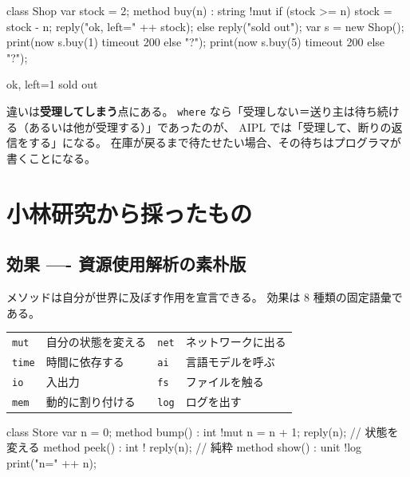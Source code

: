 \documentclass[11pt,a4paper]{ltjsarticle}
\theoremstyle{definition}
\theoremstyle{remark}
\begin{document}
\begin{aipl}
class Shop {
  var stock = 2;
  method buy(n) : string !{mut} {
    if (stock >= n) { stock = stock - n; reply("ok, left=" ++ stock); }
    else { reply("sold out"); }
  }
}
var s = new Shop();
print(now s.buy(1) timeout 200 else "?");
print(now s.buy(5) timeout 200 else "?");
\end{aipl}
\begin{term}
ok, left=1
sold out
\end{term}

違いは\textbf{受理してしまう}点にある。
\texttt{where} なら「受理しない＝送り主は待ち続ける（あるいは他が受理する）」であったのが、
AIPL では「受理して、断りの返信をする」になる。
在庫が戻るまで待たせたい場合、その待ちはプログラマが書くことになる。

\section{小林研究から採ったもの}
\label{sec:koba-take}

\subsection{効果 ---- 資源使用解析の素朴版}

メソッドは自分が世界に及ぼす作用を宣言できる。
効果は 8 種類の固定語彙である。

\begin{center}
\begin{tabular}{ll@{\qquad}ll}
\toprule
\texttt{mut}  & 自分の状態を変える    & \texttt{net} & ネットワークに出る \\
\texttt{time} & 時間に依存する        & \texttt{ai}  & 言語モデルを呼ぶ \\
\texttt{io}   & 入出力                & \texttt{fs}  & ファイルを触る \\
\texttt{mem}  & 動的に割り付ける      & \texttt{log} & ログを出す \\
\bottomrule
\end{tabular}
\end{center}

\begin{aipl}
class Store {
  var n = 0;
  method bump()  : int !{mut}  { n = n + 1; reply(n); }   // 状態を変える
  method peek()  : int !{}     { reply(n); }              // 純粋
  method show()  : unit !{log} { print("n=" ++ n); }
}
\end{aipl}
\end{document}
